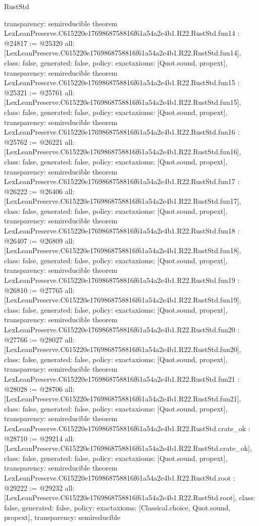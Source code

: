 \begin{lexlean}{RustStd}
\begin{coremodule}
{  transparency: semireducible
}
theorem LexLeanPreserve.C615220e1769868758816f61a54a2e4b1.R22.RustStd.fun14 : @24817 := @25320 {
  all: [LexLeanPreserve.C615220e1769868758816f61a54a2e4b1.R22.RustStd.fun14],
  class: false,
  generated: false,
  policy: exact{axioms: [Quot.sound, propext]},
  transparency: semireducible
}
theorem LexLeanPreserve.C615220e1769868758816f61a54a2e4b1.R22.RustStd.fun15 : @25321 := @25761 {
  all: [LexLeanPreserve.C615220e1769868758816f61a54a2e4b1.R22.RustStd.fun15],
  class: false,
  generated: false,
  policy: exact{axioms: [Quot.sound, propext]},
  transparency: semireducible
}
theorem LexLeanPreserve.C615220e1769868758816f61a54a2e4b1.R22.RustStd.fun16 : @25762 := @26221 {
  all: [LexLeanPreserve.C615220e1769868758816f61a54a2e4b1.R22.RustStd.fun16],
  class: false,
  generated: false,
  policy: exact{axioms: [Quot.sound, propext]},
  transparency: semireducible
}
theorem LexLeanPreserve.C615220e1769868758816f61a54a2e4b1.R22.RustStd.fun17 : @26222 := @26406 {
  all: [LexLeanPreserve.C615220e1769868758816f61a54a2e4b1.R22.RustStd.fun17],
  class: false,
  generated: false,
  policy: exact{axioms: [Quot.sound, propext]},
  transparency: semireducible
}
theorem LexLeanPreserve.C615220e1769868758816f61a54a2e4b1.R22.RustStd.fun18 : @26407 := @26809 {
  all: [LexLeanPreserve.C615220e1769868758816f61a54a2e4b1.R22.RustStd.fun18],
  class: false,
  generated: false,
  policy: exact{axioms: [Quot.sound, propext]},
  transparency: semireducible
}
theorem LexLeanPreserve.C615220e1769868758816f61a54a2e4b1.R22.RustStd.fun19 : @26810 := @27765 {
  all: [LexLeanPreserve.C615220e1769868758816f61a54a2e4b1.R22.RustStd.fun19],
  class: false,
  generated: false,
  policy: exact{axioms: [Quot.sound, propext]},
  transparency: semireducible
}
theorem LexLeanPreserve.C615220e1769868758816f61a54a2e4b1.R22.RustStd.fun20 : @27766 := @28027 {
  all: [LexLeanPreserve.C615220e1769868758816f61a54a2e4b1.R22.RustStd.fun20],
  class: false,
  generated: false,
  policy: exact{axioms: [Quot.sound, propext]},
  transparency: semireducible
}
theorem LexLeanPreserve.C615220e1769868758816f61a54a2e4b1.R22.RustStd.fun21 : @28028 := @28706 {
  all: [LexLeanPreserve.C615220e1769868758816f61a54a2e4b1.R22.RustStd.fun21],
  class: false,
  generated: false,
  policy: exact{axioms: [Quot.sound, propext]},
  transparency: semireducible
}
theorem LexLeanPreserve.C615220e1769868758816f61a54a2e4b1.R22.RustStd.crate_ok : @28710 := @29214 {
  all: [LexLeanPreserve.C615220e1769868758816f61a54a2e4b1.R22.RustStd.crate_ok],
  class: false,
  generated: false,
  policy: exact{axioms: [Quot.sound, propext]},
  transparency: semireducible
}
theorem LexLeanPreserve.C615220e1769868758816f61a54a2e4b1.R22.RustStd.root : @29222 := @29232 {
  all: [LexLeanPreserve.C615220e1769868758816f61a54a2e4b1.R22.RustStd.root],
  class: false,
  generated: false,
  policy: exact{axioms: [Classical.choice, Quot.sound, propext]},
  transparency: semireducible
}


\end{coremodule}
\end{lexlean}
